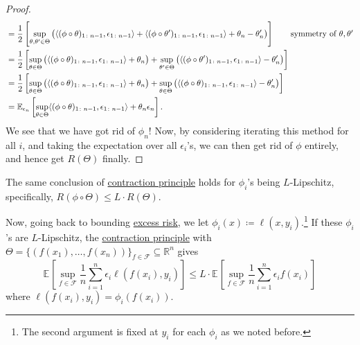 \begin{proof}
\begin{align*}
		 & = \frac{1}{2} \left[ \sup _{\theta , \theta ^{\prime} \in \Theta } \big(\langle (\phi \circ \theta )_{1 \colon n-1}, \epsilon _{1 \colon n-1} \rangle+ \langle (\phi \circ \theta ^{\prime} )_{1\colon n-1} , \epsilon _{1 \colon n-1} \rangle + \theta _n - \theta _n^{\prime} \big) \right] \tag*{symmetry of \(\theta , \theta ^{\prime} \)} \\
		 & = \frac{1}{2} \left[ \sup _{\theta \in \Theta } \big( \langle (\phi \circ \theta )_{1 \colon n-1}, \epsilon _{1 \colon n-1} \rangle + \theta _n \big) + \sup _{\theta ^{\prime} \in \Theta } \big( \langle (\phi \circ \theta ^{\prime} )_{1\colon n-1} , \epsilon _{1 \colon n-1} \rangle - \theta _n^{\prime} \big) \right]                   \\
		 & = \frac{1}{2} \left[ \sup _{\theta \in \Theta } \big( \langle (\phi \circ \theta )_{1 \colon n-1}, \epsilon _{1 \colon n-1} \rangle + \theta _n \big) + \sup _{\theta \in \Theta } \big( \langle (\phi \circ \theta )_{1\colon n-1} , \epsilon _{1 \colon n-1} \rangle - \theta _n^{\prime} \big) \right]                                       \\
		 & = \mathbb{E}_{\epsilon _n}\left[ \sup _{\theta \in \Theta } \langle (\phi \circ \theta )_{1 \colon n-1} , \epsilon _{1 \colon n-1} \rangle + \theta _n \epsilon _n \right].
	\end{align*}
	We see that we have got rid of \(\phi _n\)! Now, by considering iterating this method for all \(i\), and taking the expectation over all \(\epsilon _i\)'s, we can then get rid of \(\phi \) entirely, and hence get \(R(\Theta )\) finally.
\end{proof}

\begin{corollary}\label{col:contraction-principle}
	The same conclusion of \hyperref[thm:contraction-principle]{contraction principle} holds for \(\phi _i\)'s being \(L\)-Lipschitz, specifically, \(R(\phi \circ \Theta ) \leq L\cdot R(\Theta )\).
\end{corollary}

Now, going back to bounding \hyperref[def:excess-risk]{excess risk}, we let \(\phi _i (x) \coloneqq \ell (x, y_i)\).\footnote{The second argument is fixed at \(y_i\) for each \(\phi _i\) as we noted before.} If these \(\phi _i\)'s are \(L\)-Lipschitz, the \hyperref[col:contraction-principle]{contraction principle} with \(\Theta = \{ (f(x_1), \dots , f(x_n)) \} _{f\in \mathscr{F} } \subseteq \mathbb{R} ^n \) gives
\[
	\mathbb{E}_{}\left[\sup _{f\in \mathscr{F} } \frac{1}{n} \sum_{i=1}^{n} \epsilon _i \ell (f(x_i), y_i) \right]
	\leq L\cdot \mathbb{E}_{}\left[\sup _{f\in \mathscr{F} } \frac{1}{n} \sum_{i=1}^{n} \epsilon _i f(x_i) \right]
\]
where \(\ell (f(x_i), y_i) = \phi _i(f(x_i))\).

